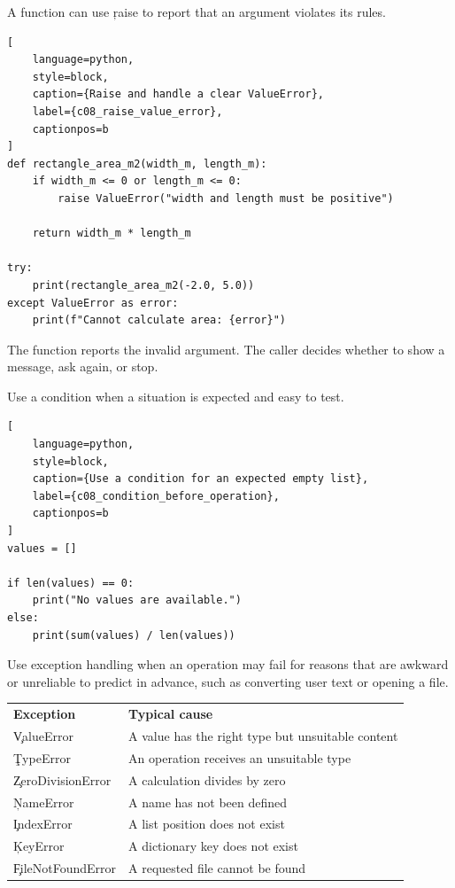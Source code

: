 
A function can use \c{raise} to report that an argument violates its rules.

\begin{lstlisting}[
    language=python,
    style=block,
    caption={Raise and handle a clear ValueError},
    label={c08_raise_value_error},
    captionpos=b
]
def rectangle_area_m2(width_m, length_m):
    if width_m <= 0 or length_m <= 0:
        raise ValueError("width and length must be positive")

    return width_m * length_m

try:
    print(rectangle_area_m2(-2.0, 5.0))
except ValueError as error:
    print(f"Cannot calculate area: {error}")
\end{lstlisting}

The function reports the invalid argument. The caller decides whether to show
a message, ask again, or stop.


Use a condition when a situation is expected and easy to test.

\begin{lstlisting}[
    language=python,
    style=block,
    caption={Use a condition for an expected empty list},
    label={c08_condition_before_operation},
    captionpos=b
]
values = []

if len(values) == 0:
    print("No values are available.")
else:
    print(sum(values) / len(values))
\end{lstlisting}

Use exception handling when an operation may fail for reasons that are awkward
or unreliable to predict in advance, such as converting user text or opening a
file.


\begin{center}
\begin{tabular}{ll}
\textbf{Exception} & \textbf{Typical cause} \\
\c{ValueError} & A value has the right type but unsuitable content \\
\c{TypeError} & An operation receives an unsuitable type \\
\c{ZeroDivisionError} & A calculation divides by zero \\
\c{NameError} & A name has not been defined \\
\c{IndexError} & A list position does not exist \\
\c{KeyError} & A dictionary key does not exist \\
\c{FileNotFoundError} & A requested file cannot be found \\
\end{tabular}
\end{center}

